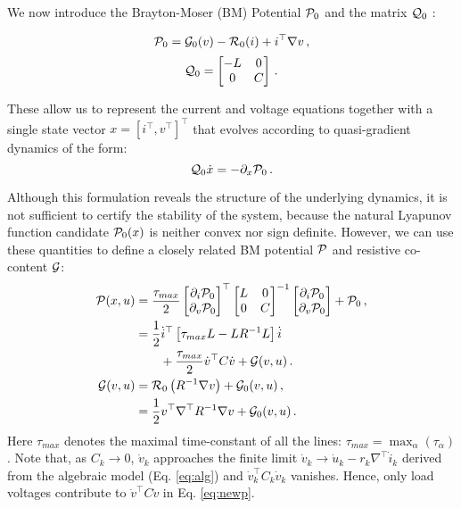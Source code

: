\documentclass[letterpaper, 10 pt, conference]{ieeeconf}
\begin{document}
We now introduce the Brayton-Moser (BM) Potential ${\cal P}_0$ and the matrix ${\cal Q}_0$ \cite{Brayton:1964gr,Jeltsema:2003jz}:

\begin{equation}
	{\cal P}_0 =  {\cal G}_0(v) - {\cal R}_0(i) + i^\top\nabla v\,,
\end{equation}
\begin{equation}
	{\cal Q}_0 =
    \begin{bmatrix}
	-L & 0\\
    0 & C 
\end{bmatrix}\,.
\end{equation}

These allow us to represent the current and voltage equations together with a single state vector $x = [i^\top, v^\top]^\top$ that evolves according to quasi-gradient dynamics of the form:
\begin{equation}\label{eq:quasigrad}
 {\cal Q}_0 \dot{x} = -\partial_x {\cal P}_0\,.
\end{equation}

Although this formulation reveals the structure of the underlying dynamics, it is not sufficient to certify the stability of the system, because the natural Lyapunov function candidate ${\cal P}_0(x)$ is neither convex nor sign definite. However, we can use these quantities to define a closely related BM potential ${\cal P}$ and resistive co-content ${\cal G}$:
\begin{align}\label{eq:newp}
	{\cal P}(x, u) 
	&= \frac{\tau_{max}}{2}\begin{bmatrix}
     \partial_i {\cal P}_0 \\
     \partial_v {\cal P}_0 
    \end{bmatrix}^\top
    \begin{bmatrix}
    L & 0 \\
    0 & C   
    \end{bmatrix}^{-1}
    \begin{bmatrix}
     \partial_i {\cal P}_0 \\
     \partial_v {\cal P}_0 
    \end{bmatrix} + {\cal P}_0\,,  \nonumber \\
    & = \frac{1}{2}\dot{i}^\top \left[\tau_{max} L - L R^{-1} L\right] \dot{i} \nonumber \\
    & \qquad + \frac{\tau_{max}}{2}\dot{v}^\top C \dot{v} + {\cal G}(v, u)\,. \\
    \mathcal{G}(v, u)
    &= {\cal R}_0\left(R^{-1}\nabla v\right) + {\cal G}_0(v, u)\,,  \nonumber \\
    &= \frac{1}{2} v^\top\nabla^\top R^{-1}\nabla v  + {\cal G}_0(v, u)\,.
\end{align}
Here $\tau_{max}$ denotes the maximal time-constant of all the lines: $\tau_{max} = \max_\alpha (\tau_\alpha)$. Note that, as $C_k\to 0$, $\dot{v}_k$ approaches the finite limit  $\dot v_k \to \dot u_k - r_k \nabla^\top \dot i_k$ derived from the algebraic model (Eq. \eqref{eq:alg}) and $\dot{v}_k^\top C_k \dot{v}_k$ vanishes. Hence, only load voltages contribute to  $\dot{v}^\top C \dot{v}$ in Eq. \eqref{eq:newp}.
\end{document}
